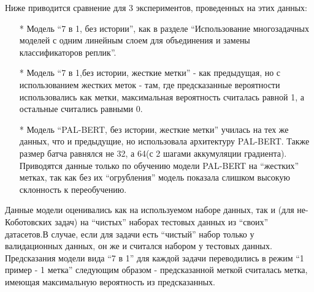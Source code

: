 Ниже приводится сравнение для 3 экспериментов, проведенных на этих данных:
\begin{itemize}
\item[*] Модель “7 в 1, без истории”, как в разделе “Использование многозадачных моделей с одним линейным слоем для объединения и замены классификаторов реплик”. 
\item[*] Модель “7 в 1,без истории, жесткие метки” - как предыдущая, но с использованием жестких меток - там, где предсказанные вероятности использовались как метки, максимальная вероятность считалась равной 1, а остальные считались равными 0. 
\item[*] Модель “PAL-BERT, без истории, жесткие метки” училась на тех же данных, что и предыдущие, но использовала архитектуру PAL-BERT. Также размер батча равнялся не 32, а 64(с 2 шагами аккумуляции градиента). Приводятся данные только по обучению модели PAL-BERT на “жестких” метках, так как без их “огрубления” модель показала слишком высокую склонность к переобучению.
\end{itemize}
Данные модели оценивались как на используемом наборе данных, так и  (для не-Коботовских задач) на “чистых” наборах тестовых данных из “своих” датасетов.В случае, если для задачи есть “чистый” набор только у валидационных данных, он же и считался набором у тестовых данных.
Предсказания модели вида “7 в 1” для каждой задачи переводились в режим “1 пример - 1 метка” следующим образом - предсказанной меткой считалась метка, имеющая максимальную вероятность из предсказанных.

